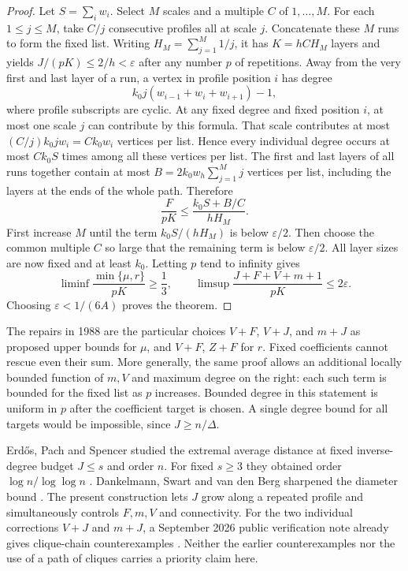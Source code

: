 \documentclass[11pt,a4paper]{article}
\theoremstyle{remark}\newtheorem*{remark}{Remark}
\begin{document}
\begin{proof}
Let $S=\sum_i w_i$. Select $M$ scales and a multiple $C$ of
$1,\ldots,M$. For each $1\le j\le M$, take $C/j$ consecutive profiles
all at scale $j$. Concatenate these $M$ runs to form the fixed list.
Writing $H_M=\sum_{j=1}^M1/j$, it has $K=hCH_M$ layers and yields
$J/(pK)\le2/h<\varepsilon$ after any number $p$ of repetitions.
Away from the very first and last layer of a run, a vertex in profile
position $i$ has degree
\[
 k_0 j(w_{i-1}+w_i+w_{i+1})-1,
\]
where profile subscripts are cyclic. At any fixed degree and fixed
position $i$, at most one scale $j$ can contribute by this formula.
That scale contributes at most $(C/j)k_0jw_i=Ck_0w_i$ vertices per list.
Hence every individual degree occurs at most $Ck_0 S$ times among all
these vertices per list. The first and last layers of all runs together
contain at most $B=2k_0w_h\sum_{j=1}^M j$ vertices per list, including
the layers at the ends of the whole path. Therefore
\[
 \frac{F}{pK}\le \frac{k_0 S+B/C}{hH_M}.
\]
First increase $M$ until the term $k_0S/(hH_M)$ is below
$\varepsilon/2$. Then choose the common multiple $C$ so large that
the remaining term is below $\varepsilon/2$. All layer sizes are now
fixed and at least $k_0$. Letting $p$ tend to infinity gives
\[
 \liminf\frac{\min\{\mu,r\}}{pK}\ge\frac13,
 \qquad \limsup\frac{J+F+V+m+1}{pK}\le2\varepsilon.
\]
Choosing $\varepsilon<1/(6A)$ proves the theorem.
\end{proof}

The repairs in 1988 are the particular choices $V+F$, $V+J$, and
$m+J$ as proposed upper bounds for $\mu$, and $V+F$, $Z+F$ for $r$.
Fixed coefficients cannot rescue even their sum. More generally, the
same proof allows an additional locally bounded function of $m,V$ and
maximum degree on the right: each such term is bounded for the fixed
list as $p$ increases. Bounded degree in this statement is uniform in
$p$ after the coefficient target is chosen. A single degree bound for
all targets would be impossible, since $J\ge n/\Delta$.

Erd\H{o}s, Pach and Spencer studied the extremal average distance at
fixed inverse-degree budget $J\le s$ and order $n$. For fixed $s\ge3$
they obtained order $\log n/\log\log n$ \cite{chain-eps}. Dankelmann, Swart and van den Berg sharpened the diameter bound \cite{eps-follow}. The present
construction lets $J$ grow along a repeated profile and simultaneously
controls $F,m,V$ and connectivity. For the two individual corrections
$V+J$ and $m+J$, a September 2026 public verification note already gives
clique-chain counterexamples \cite{chain-wow45}. Neither the earlier
counterexamples nor the use of a path of cliques carries a priority
claim here.
\end{document}
